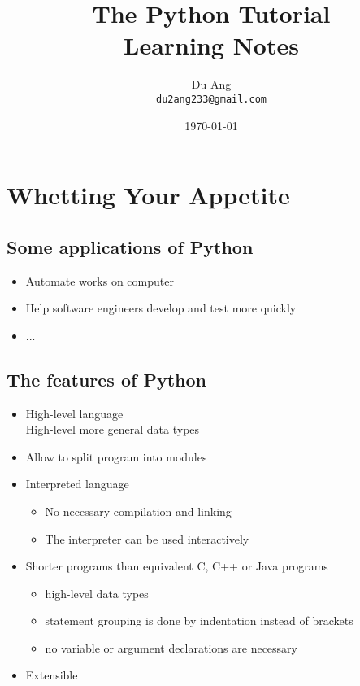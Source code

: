 \documentclass[UTF8]{article}
\title{The Python Tutorial \\
        Learning Notes}
\author{Du Ang \\ \texttt{du2ang233@gmail.com} }
\date{\today}
\begin{document}
\maketitle

\tableofcontents
\newpage

\section{Whetting Your Appetite}
\subsection{Some applications of Python}
\begin{itemize}
    \item Automate works on computer
    \item Help software engineers develop and test more quickly
    \item ...
\end{itemize}

\subsection{The features of Python}
\begin{itemize}
    \item High-level language \\
    High-level more general data types
    \item Allow to split program into modules
    \item Interpreted language
    \begin{itemize}
        \item No necessary compilation and linking
        \item The interpreter can be used interactively
    \end{itemize}
    \item Shorter programs than equivalent C, C++ or Java programs
    \begin{itemize}
        \item high-level data types
        \item statement grouping is done by indentation instead of brackets
        \item no variable or argument declarations are necessary
    \end{itemize}
    \item Extensible
\end{itemize}
\end{document}
